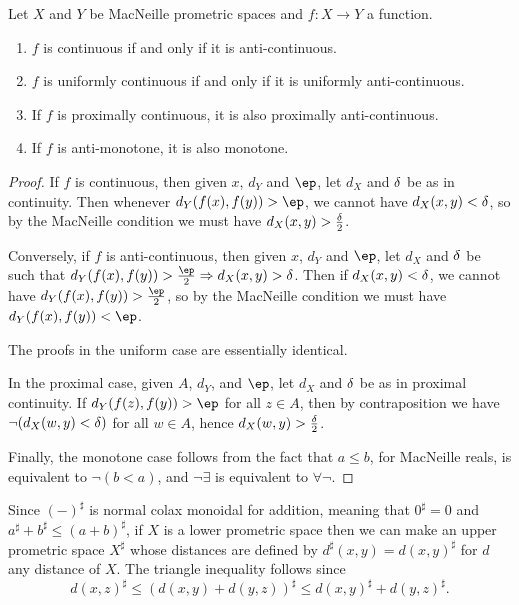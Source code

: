 \documentclass{article}
\def\upp#1{{#1}^{\sharp}}
\let\implies\Rightarrow
\def\hfep{\frac{\ep}{2}}
\begin{document}
\begin{thm}\label{thm:anti-continuous}
  Let $X$ and $Y$ be MacNeille prometric spaces and $f:X\to Y$ a function.
  \begin{enumerate}
  \item $f$ is continuous if and only if it is anti-continuous.
  \item $f$ is uniformly continuous if and only if it is uniformly anti-continuous.
  \item If $f$ is proximally continuous, it is also proximally anti-continuous.
  \item If $f$ is anti-monotone, it is also monotone.
  \end{enumerate}
\end{thm}
\begin{proof}
  If $f$ is continuous, then given $x$, $d_Y$ and $\ep$, let $d_X$ and $\delta$ be as in continuity.
  Then whenever $d_Y(f(x),f(y)) > \ep$, we cannot have $d_X(x,y) < \delta$, so by the MacNeille condition we must have $d_X(x,y) > \frac{\delta}{2}$.

  Conversely, if $f$ is anti-continuous, then given $x$, $d_Y$ and $\ep$, let $d_X$ and $\delta$ be such that $d_Y(f(x),f(y))>\hfep \implies d_X(x,y)>\de$.
  Then if $d_X(x,y)<\delta$, we cannot have $d_Y(f(x),f(y))>\hfep$, so by the MacNeille condition we must have $d_Y(f(x),f(y))<\ep$.

  The proofs in the uniform case are essentially identical.

  In the proximal case, given $A$, $d_Y$, and $\ep$, let $d_X$ and $\delta$ be as in proximal continuity.
  If $d_Y(f(z),f(y))>\ep$ for all $z\in A$, then by contraposition we have $\neg (d_X(w,y)<\delta)$ for all $w\in A$, hence $d_X(w,y)>\frac{\delta}{2}$.

  Finally, the monotone case follows from the fact that $a\le b$, for MacNeille reals, is equivalent to $\neg(b<a)$, and $\neg\exists$ is equivalent to $\forall\neg$.
\end{proof}

Since $\upp{(-)}$ is normal colax monoidal for addition, meaning that $\upp{0} = 0$ and $\upp{a}+\upp{b} \le \upp{(a+b)}$, if $X$ is a lower prometric space then we can make an upper prometric space $\upp{X}$ whose distances are defined by $\upp{d}(x,y) = \upp{d(x,y)}$ for $d$ any distance of $X$.
The triangle inequality follows since
\[ \upp{d(x,z)} \le \upp{(d(x,y)+d(y,z))} \le \upp{d(x,y)} + \upp{d(y,z)}. \]
\end{document}
